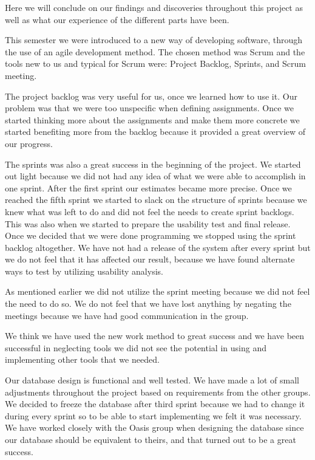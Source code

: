 Here we will conclude on our findings and discoveries throughout this project as well as what our experience of the different parts have been.

This semester we were introduced to a new way of developing software, through the use of an agile development method. 
The chosen method was Scrum and the tools new to us and typical for Scrum were: Project Backlog, Sprints, and Scrum meeting.

The project backlog was very useful for us, once we learned how to use it. Our problem was that we were too unspecific when defining assignments. Once we started thinking more about the assignments and make them more concrete we started benefiting more from the backlog because it provided a great overview of our progress.

The sprints was also a great success in the beginning of the project. We started out light because we did not had any idea of what we were able to accomplish in one sprint. After the first sprint our estimates became more precise. Once we reached the fifth sprint we started to slack on the structure of sprints because we knew what was left to do and did not feel the needs to create sprint backlogs. This was also when we started to prepare the usability test and final release. Once we decided that we were done programming we stopped using the sprint backlog altogether. We have not had a release of the system after every sprint but we do not feel that it has affected our result, because we have found alternate ways to test by utilizing usability analysis.

As mentioned earlier we did not utilize the sprint meeting because we did not feel the need to do so. We do not feel that we have lost anything by negating the meetings because we have had good communication in the group.

We think we have used the new work method to great success and we have been successful in neglecting tools we did not see the potential in using and implementing other tools that we needed. 

Our database design is functional and well tested. We have made a lot of small adjustments throughout the project based on requirements from the other groups. We decided to freeze the database after third sprint because we had to change it during every sprint so to be able to start implementing we felt it was necessary. We have worked closely with the Oasis group when designing the database since our database should be equivalent to theirs, and that turned out to be a great success.

